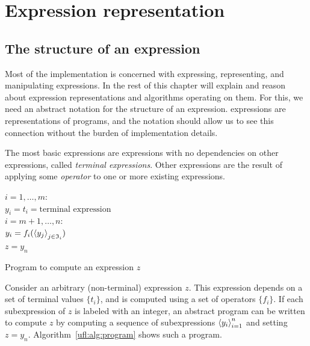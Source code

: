 \section{Expression representation} \label{ufl:sec:representation}

\subsection{The structure of an expression} \label{ufl:sec:expressions}

Most of the \ufl{} implementation is concerned with expressing,
representing, and manipulating expressions. In the rest of this chapter
will explain and reason about expression representations and
algorithms operating on them. For this, we need an abstract notation
for the structure of an expression.
\ufl{} expressions are representations of programs, and the notation should
allow us to see this connection without the burden of implementation
details.

The most basic \ufl{} expressions are expressions with no dependencies
on other expressions, called \emph{terminal expressions}.
Other expressions are the result of applying some \emph{operator}
to one or more existing expressions.

\begin{algorithm}
\afor $i = 1, \ldots, m$:\\
\tab $ y_i =  t_i = \mbox{terminal expression}$ \\
\afor $i = m+1, \ldots, n$:\\
\tab $ y_i =  f_i(\left\langle{y_j}\right\rangle_{j\in\mathfrak{I}_i})$ \\
$z = y_n$
\caption{Program to compute an expression $z$}
\label{ufl:alg:program}
\end{algorithm}

Consider an arbitrary (non-terminal) expression $z$.  This expression
depends on a set of terminal values $\{ t_i \}$, and is computed using
a set of operators $\{ f_i \}$.  If each subexpression of $z$ is
labeled with an integer, an abstract program can be written to compute
$z$ by computing a sequence of subexpressions $\left\langle{y_i}\right\rangle_{i=1}^n$ and
setting $z = y_n$.  Algorithm~\ref{ufl:alg:program} shows such a
program.

